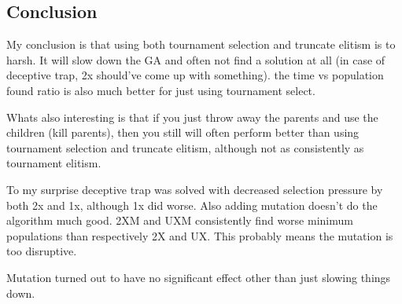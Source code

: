 \documentclass{article}
\begin{document}
\begin{empfile}
\newpage


\section{Conclusion}
My conclusion is that using both tournament selection and truncate elitism
is to harsh. It will slow down the GA and often not find a solution at all
(in case of deceptive trap, 2x should've come up with something). the 
time vs population found ratio is also much better for just using tournament
select.

Whats also interesting is that if you just throw away the parents and use 
the children (kill parents), then you still will often perform better than
using tournament selection and truncate elitism, although not as 
consistently as tournament elitism.

To my surprise deceptive trap was solved with decreased selection pressure
by both 2x and 1x, although 1x did worse. Also adding mutation doesn't do
the algorithm much good. 2XM and UXM consistently find worse minimum populations
than respectively 2X and UX{.}
This probably means the mutation is too disruptive.

Mutation turned out to have no significant effect other than just slowing
things down.

\end{empfile}
\end{document}
